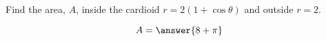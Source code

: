 \documentclass{ximera}
\author{David Guichard \and Neal Koblitz \and H. Jerome Keisler \and Albert Scheller \and Barry Balof \and Mike Wills \and Matthew Carr}
\begin{document}
\begin{exercise}





Find the area, $A$, inside the cardioid $r=2(1+\cos\theta)$ and outside $r=2$.
\begin{prompt}
\[
A=\answer{8+\pi}
\]
\end{prompt}



\end{exercise}
\end{document}
